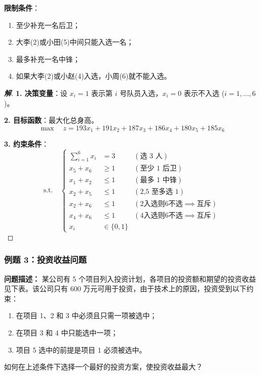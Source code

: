 \documentclass[a4paper,12pt]{ctexart} %
\newenvironment{solution}{\begin{proof}[\textbf{解}]}{\end{proof}}
\begin{document}
	\textbf{限制条件}：
	\begin{enumerate}
		\item 至少补充一名后卫；
		\item 大李(2)或小田(5)中间只能入选一名；
		\item 最多补充一名中锋；
		\item 如果大李(2)或小赵(4)入选，小周(6)就不能入选。
	\end{enumerate}
	
	\begin{solution}
		\textbf{1. 决策变量}：设 $x_i = 1$ 表示第 $i$ 号队员入选，$x_i = 0$ 表示不入选 ($i=1,\dots,6$)。
		
		\textbf{2. 目标函数}：最大化总身高。
		$$ \max \quad z = 193x_1 + 191x_2 + 187x_3 + 186x_4 + 180x_5 + 185x_6 $$
		
		\textbf{3. 约束条件}：
		\begin{equation*}
			\text{s.t.} \quad \left\{
			\begin{aligned}
				\sum_{i=1}^{6} x_i &= 3 \quad &(\text{选 3 人}) \\
				x_5 + x_6 &\ge 1 \quad &(\text{至少 1 后卫}) \\
				x_1 + x_2 &\le 1 \quad &(\text{最多 1 中锋}) \\
				x_2 + x_5 &\le 1 \quad &(\text{2,5 至多选 1}) \\
				x_2 + x_6 &\le 1 \quad &(\text{2入选则6不选} \implies \text{互斥}) \\
				x_4 + x_6 &\le 1 \quad &(\text{4入选则6不选} \implies \text{互斥}) \\
				x_i &\in \{0, 1\}
			\end{aligned}
			\right.
		\end{equation*}
	\end{solution}
	
	\subsubsection{例题 3：投资收益问题}
	
	\textbf{问题描述：}
	某公司有 5 个项目列入投资计划，各项目的投资额和期望的投资收益见下表。该公司只有 600 万元可用于投资，由于技术上的原因，投资受到以下约束：
	\begin{enumerate}
		\item 在项目 1、2 和 3 中必须且只需一项被选中；
		\item 在项目 3 和 4 中只能选中一项；
		\item 项目 5 选中的前提是项目 1 必须被选中。
	\end{enumerate}
	如何在上述条件下选择一个最好的投资方案，使投资收益最大？
	
\end{document}
